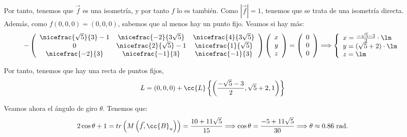 \begin{ejercicio}
\begin{enumerate}
        Por tanto, tenemos que $\vec{f}$ es una isometría, y por tanto $f$ lo es también. Como $\left|\vec{f}\right|=1$, tenemos que se trata de una isometría directa. Además, como $f(0,0,0)=(0,0,0)$, sabemos que al menos hay un punto fijo. Veamos si hay más:
        \begin{equation*}
            -\left(
            \begin{array}{ccc}
                \nicefrac{\sqrt{5}}{3}-1 & \nicefrac{-2}{3\sqrt{5}} & \nicefrac{4}{3\sqrt{5}} \\
                0 & \nicefrac{2}{\sqrt{5}}-1 & \nicefrac{1}{\sqrt{5}} \\
                \nicefrac{-2}{3} & \nicefrac{-1}{3} & \nicefrac{-1}{3} 
            \end{array}
            \right)
            \left(
            \begin{array}{c}
                x \\ y \\ z
            \end{array}
            \right)
            = \left(
            \begin{array}{c}
                0 \\ 0 \\ 0
            \end{array}
            \right) \Longrightarrow \left\{\begin{array}{l}
                x = \frac{-\sqrt{5}-3}{2} \cdot \lm \\
                y = (\sqrt{5}+2)\cdot \lm \\
                z = \lm
            \end{array}\right.
        \end{equation*}

        Por tanto, tenemos que hay una recta de puntos fijos, $$L=(0,0,0)+\cc{L}\left\{\left(\frac{-\sqrt{5}-3}{2}, \sqrt{5}+2, 1\right)\right\}$$

        Veamos ahora el ángulo de giro $\theta$. Tenemos que:
        \begin{equation*}
            2\cos\theta +1 = tr\left(M\left(\vec{f}, \cc{B}_u\right)\right) = \frac{10+11\sqrt{5}}{15} \Longrightarrow \cos\theta = \frac{-5+11\sqrt{5}}{30} \Longrightarrow \theta \approx 0.86\text{ rad.}
        \end{equation*}        
    \end{enumerate}
\end{ejercicio}

